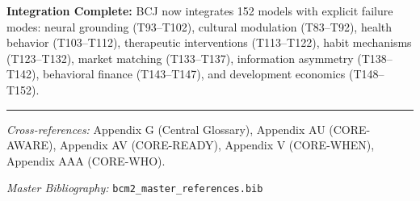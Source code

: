 \begin{tcolorbox}[colback=green!5!white, colframe=green!75!black,
    title=Complete Framework: 152 Theorems Across 29 Categories]
\textbf{Integration Complete:} BCJ now integrates 152 models with explicit failure modes: neural grounding (T93--T102), cultural modulation (T83--T92), health behavior (T103--T112), therapeutic interventions (T113--T122), habit mechanisms (T123--T132), market matching (T133--T137), information asymmetry (T138--T142), behavioral finance (T143--T147), and development economics (T148--T152).
\end{tcolorbox}



\vspace{1em}
\hrule
\vspace{0.5em}

\noindent\textit{Cross-references:}
Appendix G (Central Glossary),
Appendix AU (CORE-AWARE),
Appendix AV (CORE-READY),
Appendix V (CORE-WHEN),
Appendix AAA (CORE-WHO).

\noindent\textit{Master Bibliography:} \texttt{bcm2\_master\_references.bib}

